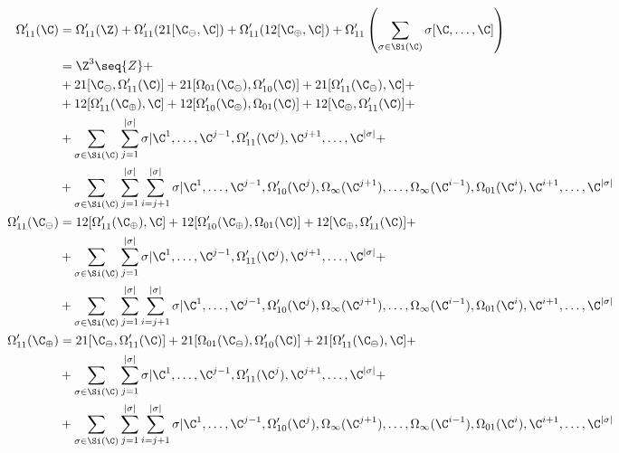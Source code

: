 \begin{align*}
  \Omega'_{11}(\C)   &= \Omega'_{11}(\Z) + \Omega'_{11}(21[\C_\ominus,\C]) + \Omega'_{11}(12[\C_\oplus, \C]) + \Omega'_{11}\left(\sum_{\sigma \in \Si(\C)}\sigma[\C,\ldots,\C]\right)\\
                    &= \Z^3\seq{Z}+\\
                     &+ 21[\C_\ominus,\Omega'_{11}(\C)] + 21[\Omega_{01}(\C_\ominus),\Omega'_{10}(\C)] + 21[\Omega'_{11}(\C_\ominus),\C] +\\
                     &+ 12[\Omega'_{11}(\C_\oplus),\C] + 12[\Omega'_{10}(\C_\oplus),\Omega_{01}(\C)] + 12[\C_\oplus, \Omega'_{11}(\C)] +\\
                     &+ \sum_{\sigma \in \Si(\C)}\sum_{j=1}^{|\sigma|}\sigma\vert{\C^{1},\ldots,\C^{j-1},\Omega'_{11}(\C^{j}),\C^{j+1},\ldots,\C^{|\sigma|}} +\\
                     &+ \sum_{\sigma \in \Si(\C)}\sum_{j=1}^{|\sigma|}\sum_{i=j+1}^{|\sigma|}\sigma\vert{\C^{1},\ldots,\C^{j-1},\Omega'_{10}(\C^{j}),\Omega_\infty(\C^{j+1}),\ldots,\Omega_\infty(\C^{i-1}), \Omega_{01}(\C^i),\C^{i+1},\ldots,\C^{|\sigma|}}\\
  \Omega'_{11}(\C_\ominus) &= 12[\Omega'_{11}(\C_\oplus),\C] + 12[\Omega'_{10}(\C_\oplus),\Omega_{01}(\C)] + 12[\C_\oplus, \Omega'_{11}(\C)] +\\
                     &+ \sum_{\sigma \in \Si(\C)}\sum_{j=1}^{|\sigma|}\sigma\vert{\C^{1},\ldots,\C^{j-1},\Omega'_{11}(\C^{j}),\C^{j+1},\ldots,\C^{|\sigma|}} +\\
                     &+ \sum_{\sigma \in \Si(\C)}\sum_{j=1}^{|\sigma|}\sum_{i=j+1}^{|\sigma|}\sigma\vert{\C^{1},\ldots,\C^{j-1},\Omega'_{10}(\C^{j}),\Omega_\infty(\C^{j+1}),\ldots,\Omega_\infty(\C^{i-1}), \Omega_{01}(\C^i),\C^{i+1},\ldots,\C^{|\sigma|}}\\
  \Omega'_{11}(\C_\oplus) &= 21[\C_\ominus,\Omega'_{11}(\C)] + 21[\Omega_{01}(\C_\ominus),\Omega'_{10}(\C)] + 21[\Omega'_{11}(\C_\ominus),\C] +\\
                       &+ \sum_{\sigma \in \Si(\C)}\sum_{j=1}^{|\sigma|}\sigma\vert{\C^{1},\ldots,\C^{j-1},\Omega'_{11}(\C^{j}),\C^{j+1},\ldots,\C^{|\sigma|}} +\\
                     &+ \sum_{\sigma \in \Si(\C)}\sum_{j=1}^{|\sigma|}\sum_{i=j+1}^{|\sigma|}\sigma\vert{\C^{1},\ldots,\C^{j-1},\Omega'_{10}(\C^{j}),\Omega_\infty(\C^{j+1}),\ldots,\Omega_\infty(\C^{i-1}), \Omega_{01}(\C^i),\C^{i+1},\ldots,\C^{|\sigma|}}
\end{align*}

